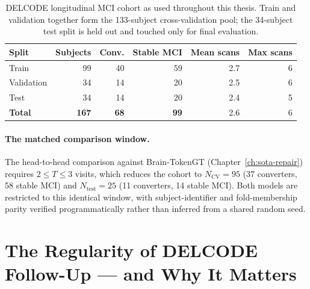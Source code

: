 \begin{table}[htbp]
  \centering
  \small
  \begin{tabular}{@{}lrrrrr@{}}
    \toprule
    \textbf{Split} & \textbf{Subjects} & \textbf{Conv.} & \textbf{Stable MCI}
      & \textbf{Mean scans} & \textbf{Max scans} \\
    \midrule
    Train      & 99  & 40 & 59 & 2.7 & 6 \\
    Validation & 34  & 14 & 20 & 2.5 & 6 \\
    Test       & 34  & 14 & 20 & 2.4 & 5 \\
    \midrule
    \textbf{Total} & \textbf{167} & \textbf{68} & \textbf{99} & 2.6 & 6 \\
    \bottomrule
  \end{tabular}
  \caption{DELCODE longitudinal MCI cohort as used throughout this thesis. Train and
    validation together form the 133-subject cross-validation pool; the 34-subject test
    split is held out and touched only for final evaluation.}
  \label{tab:delcode-cohort}
\end{table}


\paragraph{The matched comparison window.} The head-to-head comparison against
Brain-TokenGT (Chapter~\ref{ch:sota-repair}) requires $2 \le T \le 3$ visits, which reduces
the cohort to $N_{\text{CV}} = 95$ (37 converters, 58 stable MCI) and $N_{\text{test}} = 25$
(11 converters, 14 stable MCI). Both models are restricted to this identical window, with
subject-identifier and fold-membership parity verified programmatically rather than inferred
from a shared random seed.

\section{The Regularity of DELCODE Follow-Up --- and Why It Matters}
\label{sec:delta-t-finding}

